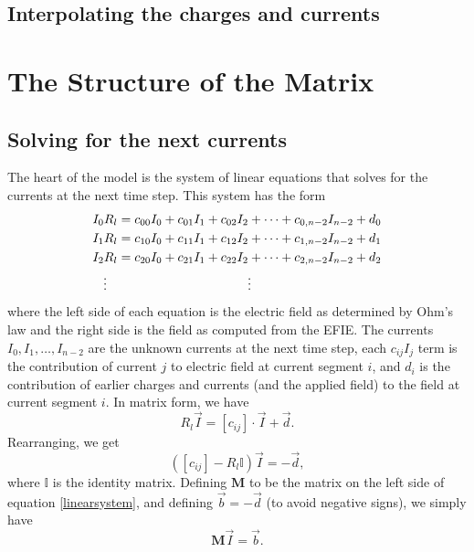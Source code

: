 \documentclass{article}
\newcommand{\mat}{\mathbf}
\begin{document}
\subsection{Interpolating the charges and currents}

\section{The Structure of the Matrix}
\subsection{Solving for the next currents}

The heart of the model is the system of linear equations that solves for the currents at the next time step. This system has the form
\begin{align}
\begin{split}
I_0R_l &= c_{00}I_0 + c_{01}I_1 + c_{02}I_2 + \cdots + c_{0,n-2}I_{n-2} + d_0 \\
I_1R_l &= c_{10}I_0 + c_{11}I_1 + c_{12}I_2 + \cdots + c_{1,n-2}I_{n-2} + d_1 \\
I_2R_l &= c_{20}I_0 + c_{21}I_1 + c_{22}I_2 + \cdots + c_{2,n-2}I_{n-2} + d_2 \\
\vdotswithin{I_2R_l} & \vdotswithin{= c_{20}I_0 + c_{21}I_1 + c_{22}I_2 + \cdots + c_{2,n-2}I_{n-2} + d_2}
\end{split}
\end{align}
where the left side of each equation is the electric field as determined by Ohm's law and the right side is the field as computed from the EFIE. The currents $I_0, I_1, \ldots, I_{n-2}$ are the unknown currents at the next time step, each $c_{ij}I_j$ term is the contribution of current $j$ to electric field at current segment $i$, and $d_i$ is the contribution of earlier charges and currents (and the applied field) to the field at current segment $i$. In matrix form, we have
\begin{equation}
R_l\vec{I} = \left[c_{ij}\right] \cdot \vec{I} + \vec{d}.
\end{equation}
Rearranging, we get
\begin{equation}
\label{linearsystem}
\left(\left[c_{ij}\right] - R_l\mathbb{I}\right) \vec{I} = -\vec{d},
\end{equation}
where $\mathbb{I}$ is the identity matrix. Defining $\mat{M}$ to be the matrix on the left side of equation \ref{linearsystem}, and defining $\vec{b} = -\vec{d}$ (to avoid negative signs), we simply have
\begin{equation}
\label{mib}
\mat{M} \vec{I} = \vec{b}.
\end{equation}
\end{document}

